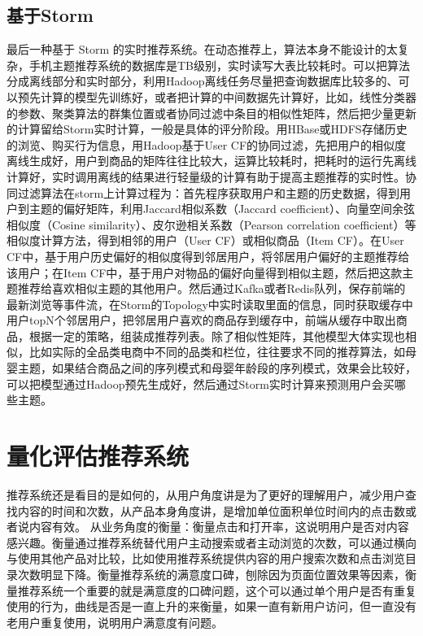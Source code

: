     \subsection{基于Storm}
    最后一种基于 Storm 的实时推荐系统。在动态推荐上，算法本身不能设计的太复杂，手机主题推荐系统的数据库是TB级别，实时读写大表比较耗时。可以把算法分成离线部分和实时部分，利用Hadoop离线任务尽量把查询数据库比较多的、可以预先计算的模型先训练好，或者把计算的中间数据先计算好，比如，线性分类器的参数、聚类算法的群集位置或者协同过滤中条目的相似性矩阵，然后把少量更新的计算留给Storm实时计算，一般是具体的评分阶段。用HBase或HDFS存储历史的浏览、购买行为信息，用Hadoop基于User CF的协同过滤，先把用户的相似度离线生成好，用户到商品的矩阵往往比较大，运算比较耗时，把耗时的运行先离线计算好，实时调用离线的结果进行轻量级的计算有助于提高主题推荐的实时性。协同过滤算法在storm上计算过程为：首先程序获取用户和主题的历史数据，得到用户到主题的偏好矩阵，利用Jaccard相似系数（Jaccard coefficient）、向量空间余弦相似度（Cosine similarity）、皮尔逊相关系数（Pearson correlation coefficient）等相似度计算方法，得到相邻的用户（User CF）或相似商品（Item CF）。在User CF中，基于用户历史偏好的相似度得到邻居用户，将邻居用户偏好的主题推荐给该用户；在Item CF中，基于用户对物品的偏好向量得到相似主题，然后把这款主题推荐给喜欢相似主题的其他用户。然后通过Kafka或者Redis队列，保存前端的最新浏览等事件流，在Storm的Topology中实时读取里面的信息，同时获取缓存中用户topN个邻居用户，把邻居用户喜欢的商品存到缓存中，前端从缓存中取出商品，根据一定的策略，组装成推荐列表。除了相似性矩阵，其他模型大体实现也相似，比如实际的全品类电商中不同的品类和栏位，往往要求不同的推荐算法，如母婴主题，如果结合商品之间的序列模式和母婴年龄段的序列模式，效果会比较好，可以把模型通过Hadoop预先生成好，然后通过Storm实时计算来预测用户会买哪些主题。

  \section{量化评估推荐系统}
  推荐系统还是看目的是如何的，从用户角度讲是为了更好的理解用户，减少用户查找内容的时间和次数，从产品本身角度讲，是增加单位面积单位时间内的点击数或者说内容有效。 从业务角度的衡量：衡量点击和打开率，这说明用户是否对内容感兴趣。衡量通过推荐系统替代用户主动搜索或者主动浏览的次数，可以通过横向与使用其他产品对比较，比如使用推荐系统提供内容的用户搜索次数和点击浏览目录次数明显下降。衡量推荐系统的满意度口碑，刨除因为页面位置效果等因素，衡量推荐系统一个重要的就是满意度的口碑问题，这个可以通过单个用户是否有重复使用的行为，曲线是否是一直上升的来衡量，如果一直有新用户访问，但一直没有老用户重复使用，说明用户满意度有问题。
